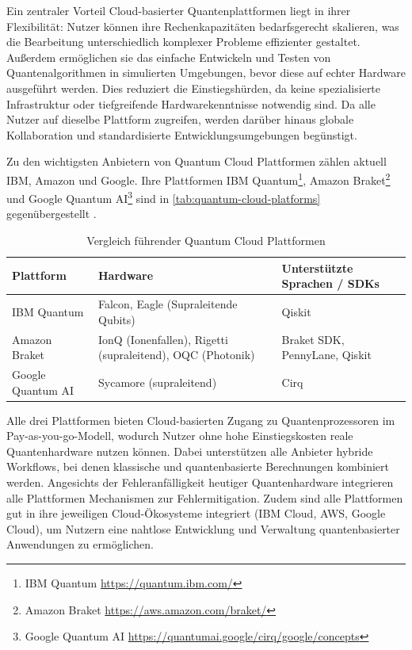 Ein zentraler Vorteil Cloud-basierter Quantenplattformen liegt in ihrer Flexibilität: Nutzer können ihre Rechenkapazitäten bedarfsgerecht skalieren, was die Bearbeitung unterschiedlich komplexer Probleme effizienter gestaltet. Außerdem ermöglichen sie das einfache Entwickeln und Testen von Quantenalgorithmen in simulierten Umgebungen, bevor diese auf echter Hardware ausgeführt werden. Dies reduziert die Einstiegshürden, da keine spezialisierte Infrastruktur oder tiefgreifende Hardwarekenntnisse notwendig sind. Da alle Nutzer auf dieselbe Plattform zugreifen, werden darüber hinaus globale Kollaboration und standardisierte Entwicklungsumgebungen begünstigt.

Zu den wichtigsten Anbietern von Quantum Cloud Plattformen zählen aktuell IBM, Amazon und Google. Ihre Plattformen IBM Quantum\footnote{IBM Quantum \url{https://quantum.ibm.com/}}, Amazon Braket\footnote{Amazon Braket \url{https://aws.amazon.com/braket/}} und Google Quantum AI\footnote{Google Quantum AI \url{https://quantumai.google/cirq/google/concepts}} sind in \autoref{tab:quantum-cloud-platforms} gegenübergestellt \autocite{trends+challenges-TODO-sync}.

\begin{table}[ht!]
\centering
\begin{tabular}{|p{2.5cm}|p{4.8cm}|p{4cm}|}
\hline
\textbf{Plattform} & \textbf{Hardware} & \textbf{Unterstützte Sprachen / SDKs} \\
\hline
IBM Quantum & Falcon, Eagle (Supraleitende Qubits) & Qiskit \\
\hline
Amazon Braket & IonQ (Ionenfallen), Rigetti (supraleitend), OQC (Photonik) & Braket SDK, PennyLane, Qiskit \\
\hline
Google Quantum AI & Sycamore (supraleitend) & Cirq \\
\hline
\end{tabular}
\caption{Vergleich führender Quantum Cloud Plattformen}
\label{tab:quantum-cloud-platforms}
\end{table}

Alle drei Plattformen bieten Cloud-basierten Zugang zu Quantenprozessoren im Pay-as-you-go-Modell, wodurch Nutzer ohne hohe Einstiegskosten reale Quantenhardware nutzen können. Dabei unterstützen alle Anbieter hybride Workflows, bei denen klassische und quantenbasierte Berechnungen kombiniert werden. Angesichts der Fehleranfälligkeit heutiger Quantenhardware integrieren alle Plattformen Mechanismen zur Fehlermitigation. Zudem sind alle Plattformen gut in ihre jeweiligen Cloud-Ökosysteme integriert (IBM Cloud, AWS, Google Cloud), um Nutzern eine nahtlose Entwicklung und Verwaltung quantenbasierter Anwendungen zu ermöglichen.

